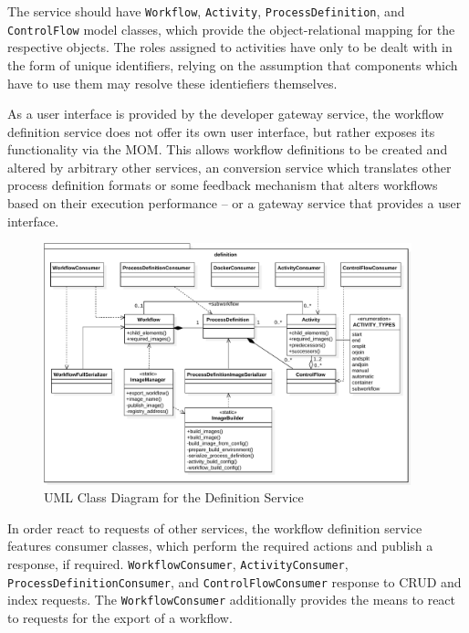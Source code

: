     The service should have \texttt{Workflow}, \texttt{Activity}, \texttt{ProcessDefinition}, and \texttt{ControlFlow} model classes, which provide the object-relational mapping for the respective objects. The roles assigned to activities have only to be dealt with in the form of unique identifiers, relying on the assumption that components which have to use them may resolve these identiefiers themselves.

    As a user interface is provided by the developer gateway service, the workflow definition service does not offer its own user interface, but rather exposes its functionality via the \ac{MOM}. This allows workflow definitions to be created and altered by arbitrary other services, \eg an conversion service which translates other process definition formats or some feedback mechanism that alters workflows based on their execution performance -- or a gateway service that provides a user interface.

    \begin{figure}[htbp]
      \centering
      \includegraphics[width=0.95\textwidth]{content/images/class_diagram_definition-crop.pdf}
      \caption{UML Class Diagram for the Definition Service}
      \label{fig:uml_class_diagram_for_the_definition_service}
    \end{figure}

    In order react to requests of other services, the workflow definition service features consumer classes, which perform the required actions and publish a response, if required. \texttt{WorkflowConsumer}, \texttt{ActivityConsumer}, \texttt{ProcessDefinitionConsumer}, and \texttt{ControlFlowConsumer} response to \ac{CRUD} and index requests. The \texttt{WorkflowConsumer} additionally provides the means to react to requests for the export of a workflow.

